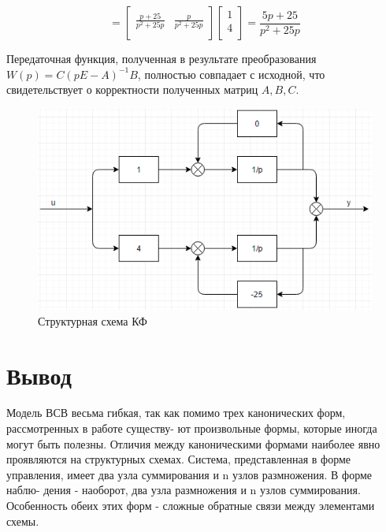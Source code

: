 \documentclass[14pt,a4paper,report]{report}
\begin{document}
\begin{equation*}
\text{$=\begin{bmatrix}
	\frac{p+25}{p^2+25p} & \frac{p}{p^2+25p} \\
	\end{bmatrix}\begin{bmatrix}
	1 \\
	4 \\
	\end{bmatrix}=\frac{5p+25}{p^2+25p}
	$}
\end{equation*}

Передаточная функция, полученная в результате преобразования $W(p)=C(pE-A)^{-1}B$, полностью совпадает с исходной, что свидетельствует о корректности полученных матриц  $A, B, C$. 


\begin{figure}[h!]
	\centering
	\includegraphics[scale = 0.9]{images/kf.png}
	\caption{Структурная схема КФ}
	\label{image:3}
\end{figure}


\newpage
\section{Вывод}


Модель ВСВ весьма гибкая, так как помимо трех канонических форм, рассмотренных в работе существу- ют произвольные формы, которые иногда могут быть полезны.
Отличия между каноническими формами наиболее явно проявляются на структурных схемах. Система, представленная в форме управления, имеет два узла суммирования и n узлов размножения. В форме наблю- дения - наоборот, два узла размножения и n узлов суммирования. Особенность обеих этих форм - сложные обратные связи между элементами схемы.
\end{document}
